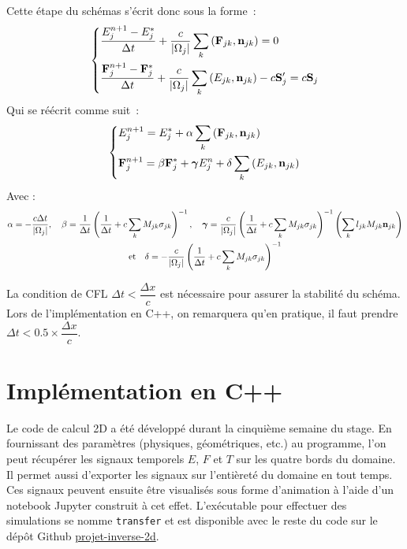 Cette étape du schémas s'écrit donc sous la forme :
\begin{equation*} 
    \begin{dcases}
    \frac{E_j^{n+1} - E_j^*}{\Delta t} + \frac{c}{\left| \Omega_j \right|} \sum_k \left( \mathbf{F}_{jk}, \mathbf{n}_{jk} \right) = 0 \\
    \frac{\mathbf{F}_j^{n+1} - \mathbf{F}_j^*}{\Delta t} + \frac{c}{\left| \Omega_j \right|} \sum_k \left( E_{jk}, \mathbf{n}_{jk} \right) -c \mathbf{S}_j^{\prime} = c \mathbf{S}_j 
    \end{dcases}   
\end{equation*}
Qui se réécrit comme suit :
\begingroup
\Large
\begin{equation} 
    \begin{dcases}
    E_j^{n+1} = E_j^* + \alpha \sum_k \left( \mathbf{F}_{jk}, \mathbf{n}_{jk} \right) \\
    \mathbf{F}_j^{n+1} = \beta \mathbf{F}_j^* + \bm{\gamma} E_j^n + \delta \sum_k \left( E_{jk}, \mathbf{n}_{jk} \right)
    \end{dcases}   
\label{eqn:Step2}
\end{equation}
\endgroup
Avec :
\begin{gather*} 
\alpha = -\frac{c \Delta t}{\left| \Omega_j \right|}, \quad 
\beta = \frac{1}{\Delta t} \left( \frac{1}{\Delta t} + c \sum_k M_{jk} \sigma_{jk} \right)^{-1}, \quad 
\bm{\gamma} = \frac{c}{\left| \Omega_j \right|} \left( \frac{1}{\Delta t} + c \sum_k M_{jk} \sigma_{jk} \right)^{-1} \left( \sum_k l_{jk} M_{jk} \mathbf{n}_{jk} \right) \\
\text{et} \quad \delta = -\frac{c}{\left| \Omega_j \right|} \left( \frac{1}{\Delta t} + c \sum_k M_{jk} \sigma_{jk} \right)^{-1}
\end{gather*}

La condition de CFL $\Delta t < \dfrac{\Delta x}{c}$ est nécessaire pour assurer la stabilité du schéma. Lors de l'implémentation en C++, on remarquera qu'en pratique, il faut prendre $\Delta t < 0.5 \times \dfrac{\Delta x}{c}.$ 

\section{Implémentation en C++}

Le code de calcul 2D a été développé durant la cinquième semaine du stage. En fournissant des paramètres (physiques, géométriques, etc.) au programme, l'on peut récupérer les signaux temporels $E$, $F$ et $T$ sur les quatre bords du domaine. Il permet aussi d'exporter les signaux sur l'entièreté du domaine en tout temps. Ces signaux peuvent ensuite être visualisés sous forme d'animation à l'aide d'un notebook Jupyter construit à cet effet. L'exécutable pour effectuer des simulations se nomme \verb|transfer| et est disponible avec le reste du code sur le dépôt Github \href{https://github.com/desmond-rn/projet-inverse-2d}{projet-inverse-2d}.

